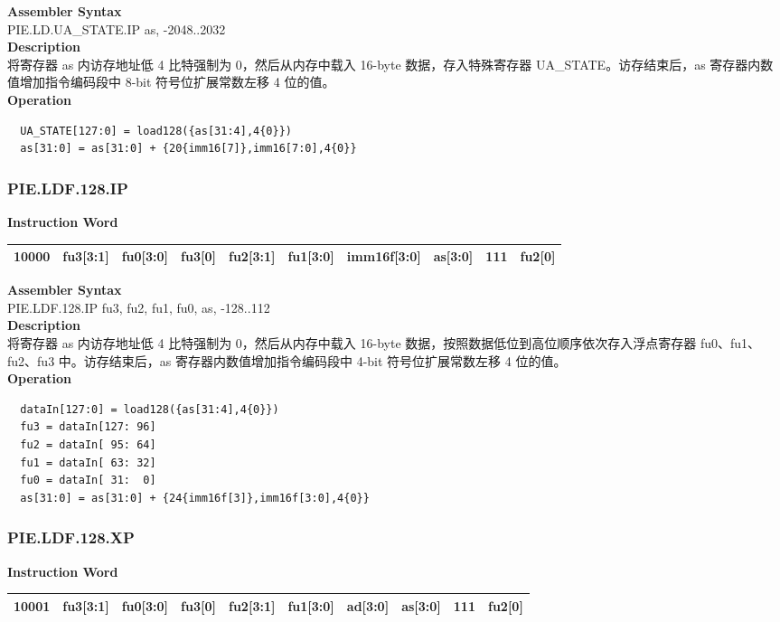 \textbf{Assembler Syntax} \\
PIE.LD.UA\_STATE.IP as, -2048..2032 \\
\textbf{Description} \\
将寄存器 as 内访存地址低 4 比特强制为 0，然后从内存中载入 16-byte 数据，存入特殊寄存器 UA\_STATE。访存结束后，as 寄存器内数值增加指令编码段中 8-bit 符号位扩展常数左移 4 位的值。\\
\textbf{Operation}
\begin{lstlisting}
  UA_STATE[127:0] = load128({as[31:4],4{0}})
  as[31:0] = as[31:0] + {20{imm16[7]},imm16[7:0],4{0}}
\end{lstlisting}

\newpage
\subsubsection{PIE.LDF.128.IP}\label{instruction:PIELDF128IP}
\setlength\tabcolsep{6pt}
\textbf{Instruction Word} \\
\begin{tabular}{|c|c|c|c|c|c|c|c|c|c|}
	\hline
	10000 & fu3[3:1] & fu0[3:0] & fu3[0] & fu2[3:1] & fu1[3:0] & imm16f[3:0] & as[3:0] & 111 & fu2[0] \\
	\hline
\end{tabular}

\textbf{Assembler Syntax} \\
PIE.LDF.128.IP fu3, fu2, fu1, fu0, as, -128..112 \\
\textbf{Description} \\
将寄存器 as 内访存地址低 4 比特强制为 0，然后从内存中载入 16-byte 数据，按照数据低位到高位顺序依次存入浮点寄存器 fu0、fu1、fu2、fu3 中。访存结束后，as 寄存器内数值增加指令编码段中 4-bit 符号位扩展常数左移 4 位的值。\\
\textbf{Operation}
\begin{lstlisting}
  dataIn[127:0] = load128({as[31:4],4{0}})
  fu3 = dataIn[127: 96]
  fu2 = dataIn[ 95: 64]
  fu1 = dataIn[ 63: 32]
  fu0 = dataIn[ 31:  0]
  as[31:0] = as[31:0] + {24{imm16f[3]},imm16f[3:0],4{0}}
\end{lstlisting}

\newpage
\subsubsection{PIE.LDF.128.XP}\label{instruction:PIELDF128XP}
\setlength\tabcolsep{6pt}
\textbf{Instruction Word} \\
\begin{tabular}{|c|c|c|c|c|c|c|c|c|c|}
	\hline
	10001 & fu3[3:1] & fu0[3:0] & fu3[0] & fu2[3:1] & fu1[3:0] & ad[3:0] & as[3:0] & 111 & fu2[0] \\
	\hline
\end{tabular}


